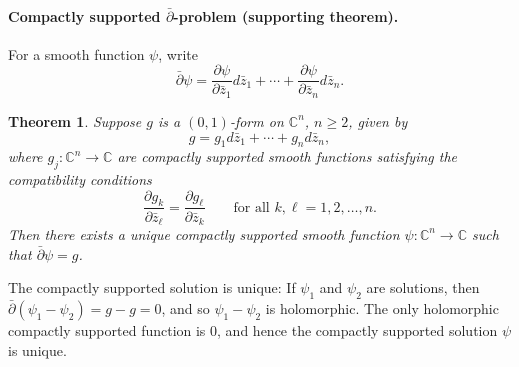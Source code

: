 \documentclass[UTF8,11pt]{ctexart}
\newtheorem*{thm}{Theorem}
\theoremstyle{definition}
\newcommand{\C}{\mathbb C}
\begin{document}
\paragraph{Compactly supported $\bar\partial$-problem (supporting theorem).}
For a smooth function $\psi$, write
\[
\bar\partial\psi=\frac{\partial\psi}{\partial\bar z_1}d\bar z_1+\cdots+\frac{\partial\psi}{\partial\bar z_n}d\bar z_n.
\]
\begin{thm}
Suppose $g$ is a $(0,1)$-form on $\C^n$, $n\geq2$, given by
\[g=g_1d\bar z_1+\cdots+g_nd\bar z_n,\]
where $g_j:\C^n\to\C$ are compactly supported smooth functions satisfying the compatibility conditions
\begin{equation}\label{eq:compatconds}
\frac{\partial g_k}{\partial\bar z_\ell}=\frac{\partial g_\ell}{\partial\bar z_k}\qquad\text{for all }k,\ell=1,2,\ldots,n.
\end{equation}
Then there exists a unique compactly supported smooth function $\psi:\C^n\to\C$ such that $\bar\partial\psi=g$.
\end{thm}
The compactly supported solution is unique: If $\psi_1$ and $\psi_2$ are solutions, then $\bar\partial(\psi_1-\psi_2)=g-g=0$, and so $\psi_1-\psi_2$ is holomorphic. The only holomorphic compactly supported function is $0$, and hence the compactly supported solution $\psi$ is unique.
\end{document}
